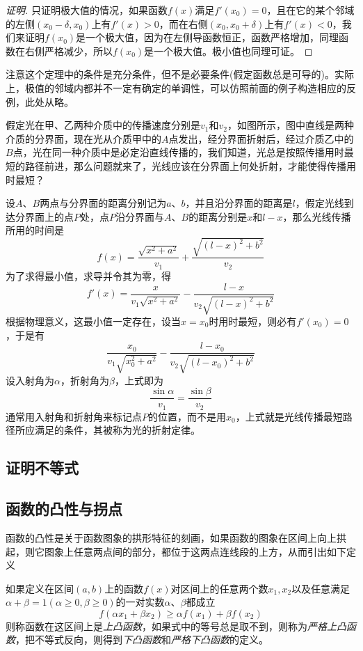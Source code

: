 \begin{proof}[证明]
 只证明极大值的情况，如果函数$f(x)$满足$f'(x_0)=0$，且在它的某个邻域的左侧$(x_0-\delta,x_0)$上有$f'(x)>0$，而在右侧$(x_0,x_0+\delta)$上有$f'(x)<0$，我们来证明$f(x_0)$是一个极大值，因为在左侧导函数恒正，函数严格增加，同理函数在右侧严格减少，所以$f(x_0)$是一个极大值。极小值也同理可证。
\end{proof}

\begin{example}
  注意这个定理中的条件是充分条件，但不是必要条件(假定函数总是可导的)。实际上，极值的邻域内都并不一定有确定的单调性，可以仿照前面的例子构造相应的反例，此处从略。
\end{example}

\begin{example}[光的折射定律]
  假定光在甲、乙两种介质中的传播速度分别是$v_1$和$v_2$，如图所示，图中直线是两种介质的分界面，现在光从介质甲中的$A$点发出，经分界面折射后，经过介质乙中的$B$点，光在同一种介质中是必定沿直线传播的，我们知道，光总是按照传播用时最短的路径前进，那么问题就来了，光线应该在分界面上何处折射，才能使得传播用时最短？

  设$A$、$B$两点与分界面的距离分别记为$a$、$b$，并且沿分界面的距离是$l$，假定光线到达分界面上的点$P$处，点$P$沿分界面与$A$、$B$的距离分别是$x$和$l-x$，那么光线传播所用的时间是
  \[ f(x) = \frac{\sqrt{x^2+a^2}}{v_1}+\frac{\sqrt{(l-x)^2+b^2}}{v_2} \]
  为了求得最小值，求导并令其为零，得
  \[ f'(x) = \frac{x}{v_1\sqrt{x^2+a^2}} - \frac{l-x}{v_2 \sqrt{(l-x)^2+b^2}} \]
  根据物理意义，这最小值一定存在，设当$x=x_0$时用时最短，则必有$f'(x_0)=0$，于是有
  \[ \frac{x_0}{v_1\sqrt{x_0^2+a^2}} - \frac{l-x_0}{v_2 \sqrt{(l-x_0)^2+b^2}}\]
  设入射角为$\alpha$，折射角为$\beta$，上式即为
  \[ \frac{\sin{\alpha}}{v_1} = \frac{\sin{\beta}}{v_2} \]
  通常用入射角和折射角来标记点$P$的位置，而不是用$x_0$，上式就是光线传播最短路径所应满足的条件，其被称为光的折射定律。
\end{example}

\subsection{证明不等式}
\label{sec:proof-inequality-use-derivative}

\subsection{函数的凸性与拐点}
\label{sec:convert-of-function}

函数的凸性是关于函数图象的拱形特征的刻画，如果函数的图象在区间上向上拱起，则它图象上任意两点间的部分，都位于这两点连线段的上方，从而引出如下定义
\begin{definition}
  如果定义在区间$(a,b)$上的函数$f(x)$对区间上的任意两个数$x_1,x_2$以及任意满足$\alpha+\beta=1(\alpha \geqslant 0,\beta \geqslant 0)$的一对实数$\alpha$、$\beta$都成立
  \[ f(\alpha x_1+\beta x_2) \geqslant \alpha f(x_1) + \beta f(x_2) \]
  则称函数在这区间上是\emph{上凸函数}，如果式中的等号总是取不到，则称为\emph{严格上凸函数}，把不等式反向，则得到\emph{下凸函数}和\emph{严格下凸函数}的定义。
\end{definition}

